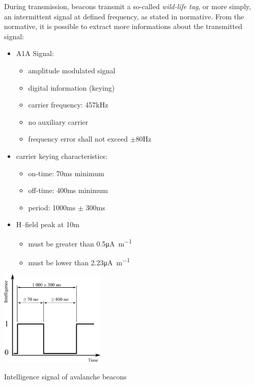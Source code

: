 During transmission, beacons transmit a so-called \emph{wild-life tag}, or more simply, an intermittent signal at defined frequency, as stated in normative\cite{NormativaARVA}. From the normative, it is possible to extract more informations about the transmitted signal:
\begin{itemize}
\item A1A Signal:
	\begin{itemize}
	\item amplitude modulated signal
	\item digital information (keying)
	\item carrier frequency: \num{457}\si{\kilo\hertz}
	\item no auxiliary carrier
	\item frequency error shall not exceed $\pm$\num{80}\si{\hertz}
	\end{itemize}
\item carrier keying characteristics:
	\begin{itemize}
	\item on-time: \num{70}\si{\milli\second} minimum
	\item off-time: \num{400}\si{\milli\second} minimum
	\item period: \num{1000}\si{\milli\second} $\pm$ \num{300}\si{\milli\second}
	\end{itemize}
\item H--field peak at \num{10}\si{\meter}
	\begin{itemize}
	\item must be greater than \num{0.5}\si{\micro\ampere\per\meter}
	\item must be lower than \num{2.23}\si{\micro\ampere\per\meter}
	\end{itemize}
\end{itemize}

\begin{marginfigure}
	\centering
	\includegraphics[width=5cm]{ch1/img/artva_signal.pdf}
	\caption{Intelligence signal of avalanche beacons}
\end{marginfigure}

